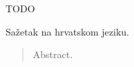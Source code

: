 \documentclass[times, utf8, diplomski, numeric]{fer}
\begin{document}
TODO







\begin{sazetak}
Sažetak na hrvatskom jeziku.

\end{sazetak}

\begin{abstract}
Abstract.

\end{abstract}
\end{document}

